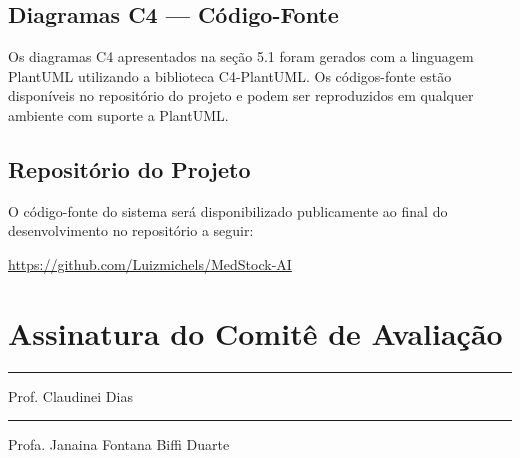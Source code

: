\documentclass[12pt,a4paper]{article}
\begin{document}
\subsection{Diagramas C4 — Código-Fonte}
Os diagramas C4 apresentados na seção 5.1 foram gerados com a linguagem
PlantUML utilizando a biblioteca C4-PlantUML. Os códigos-fonte estão
disponíveis no repositório do projeto e podem ser reproduzidos em qualquer
ambiente com suporte a PlantUML.

\subsection{Repositório do Projeto}
O código-fonte do sistema será disponibilizado publicamente ao final do
desenvolvimento no repositório a seguir:
\begin{center}
    \url{https://github.com/Luizmichels/MedStock-AI}
\end{center}

\newpage
\section{Assinatura do Comitê de Avaliação}

\vspace{3cm}
\noindent\rule{\textwidth}{0.1pt}
\centerline{Prof. Claudinei Dias}

\vspace{3cm}
\noindent\rule{\textwidth}{0.1pt}
\centerline{Profa. Janaina Fontana Biffi Duarte}
\end{document}
